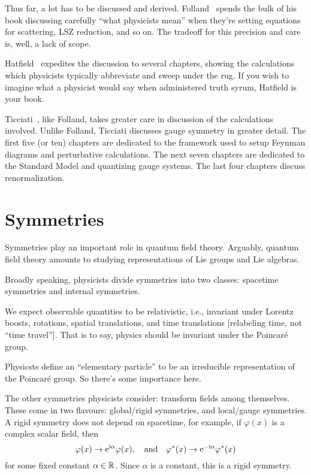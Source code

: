 Thus far, a lot has to be discussed and derived. Folland~\cite{Folland:2008zz}
spends the bulk of his book discussing carefully ``what physicists mean''
when they're setting equations for scattering, LSZ reduction, and so on.
The tradeoff for this precision and care is, well, a lack of scope.

Hatfield~\cite{Hatfield:1992rz} expedites the discussion to several
chapters, showing the calculations which physicists typically abbreviate
and sweep under the rug. If you wish to imagine what a physicist would
say when administered truth syrum, Hatfield is your book.

Ticciati~\cite{Ticciati:1999qp}, like Folland, takes greater care in
discussion of the calculations involved. Unlike Folland, Ticciati
discusses gauge symmetry in greater detail. The first five (or ten)
chapters are dedicated to the framework used to setup Feynman diagrams
and perturbative calculations. The next seven chapters are dedicated to
the Standard Model and quantizing gauge systems. The last four chapters
discuss renormalization.

\section{Symmetries}

\M
Symmetries play an important role in quantum field theory. Arguably,
quantum field theory amounts to studying representations of Lie groups
and Lie algebras.

Broadly speaking, physicists divide symmetries into two classes:
spacetime symmetries and internal symmetries.

We expect observable quantities to be relativistic, i.e., invariant
under Lorentz boosts, rotations, spatial translations, and time
translations [relabeling time, not ``time travel'']. That is to say,
physics should be invariant under the Poincar\'e group.

\M
Physicsts define an ``elementary particle'' to be an irreducible
representation of the Poincar\'e group. So there's some importance here.

The other symmetries physicists consider: transform fields among
themselves. These come in two flavours: global/rigid symmetries, and
local/gauge symmetries. A rigid symmetry does not depend on spacetime,
for example, if $\varphi(x)$ is a complex scalar field, then
\begin{equation}
\varphi(x)\to\mathrm{e}^{\mathrm{i}\alpha}\varphi(x),\quad\mbox{and}\quad
\varphi^{*}(x)\to\mathrm{e}^{-\mathrm{i}\alpha}\varphi^{*}(x)
\end{equation}
for some fixed constant $\alpha\in\mathbb{R}$. Since $\alpha$ is a constant,
this is a rigid symmetry.

